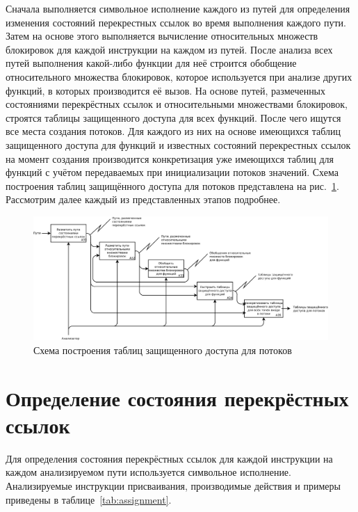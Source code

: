 Сначала выполняется символьное исполнение каждого из путей для определения изменения состояний перекрестных ссылок во время выполнения каждого пути. Затем на основе этого выполняется вычисление относительных множеств блокировок для каждой инструкции на каждом из путей. После анализа всех путей выполнения какой-либо функции для неё строится обобщение относительного множества блокировок, которое используется при анализе других  функций, в которых производится её вызов. На основе путей, размеченных состояниями перекрёстных ссылок и относительными множествами блокировок, строятся таблицы защищенного доступа для всех функций. После чего ищутся все места создания потоков.  Для каждого из них на основе имеющихся таблиц защищенного доступа для функций и известных состояний перекрестных ссылок на момент создания производится конкретизация уже имеющихся таблиц для функций с учётом передаваемых при инициализации потоков значений. Схема построения таблиц защищённого доступа для потоков представлена на рис.~\ref{fig:form-tables}. Рассмотрим далее каждый из представленных этапов подробнее.

\begin{figure}
  \centering
  \includegraphics[width=\textwidth]{inc/dia/form-tables}
  \caption{Схема построения таблиц защищенного доступа для потоков}
  \label{fig:form-tables}
\end{figure}

\section{Определение состояния перекрёстных ссылок}

Для определения состояния перекрёстных ссылок для каждой инструкции на каждом анализируемом пути используется символьное исполнение. Анализируемые инструкции присваивания, производимые действия и примеры приведены в таблице~\ref{tab:assignment}.

